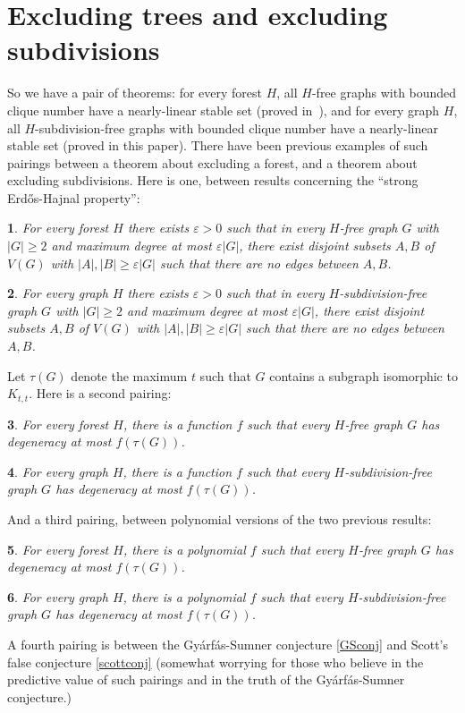 \documentclass[titlepage,11pt]{article}
\newcommand{\vare}{\varepsilon}
\newtheorem{thm}{}[section]
\begin{document}
\section{Excluding trees and excluding subdivisions}

So we have a pair of theorems: for every forest $H$, all $H$-free graphs with bounded clique number have a nearly-linear stable set 
(proved in~\cite{stable1}), and for every graph $H$, all $H$-subdivision-free graphs with bounded clique number have a nearly-linear stable set (proved in this paper).
There have been previous examples of such pairings between a theorem about excluding a forest, and a theorem about
excluding subdivisions. Here is one, between results concerning the ``strong Erd\H{o}s-Hajnal property'':
\begin{thm}\label{purepairs1}
{\bf\cite{pure1}} For every forest $H$ there exists $\vare>0$ such that in every $H$-free graph $G$ with $|G|\ge 2$ and maximum degree at most $\vare|G|$,
there exist disjoint subsets $A,B$ of $V(G)$ with $|A|,|B|\ge \vare|G|$ such that there are no edges between $A,B$.
\end{thm}
\begin{thm}\label{purepairs2}
{\bf\cite{pure2}} For every graph $H$ there exists $\vare>0$ such that in every $H$-subdivision-free graph $G$ with $|G|\ge 2$ and maximum degree at most $\vare|G|$,
there exist disjoint subsets $A,B$ of $V(G)$ with $|A|,|B|\ge \vare|G|$ such that there are no edges between $A,B$.
\end{thm}

Let $\tau(G)$ denote the maximum $t$ such that $G$ contains a subgraph isomorphic to $K_{t,t}$.
Here is a second pairing:
\begin{thm}\label{kiersteadpenrice}
{\bf\cite{kiersteadpenrice}} For every forest $H$, there is a function $f$
such that every $H$-free graph $G$ has degeneracy at most $f(\tau(G))$.
\end{thm}
\begin{thm}\label{kuhnosthus}
{\bf\cite{kuhnosthus}} For every graph $H$, there is a function $f$
such that every $H$-subdivision-free graph $G$ has degeneracy at most $f(\tau(G))$.
\end{thm}
And a third pairing, between polynomial versions of the two previous results:
\begin{thm}\label{poly1}
{\bf\cite{poly1, hunter}} For every forest $H$, there is a polynomial $f$
such that every $H$-free graph $G$ has degeneracy at most $f(\tau(G))$.
\end{thm}
\begin{thm}\label{girao}
{\bf\cite{cook, girao,hunter}} For every graph $H$, there is a polynomial $f$
such that every $H$-subdivision-free graph $G$ has degeneracy at most $f(\tau(G))$.
\end{thm}
A fourth pairing is between the Gy\'arf\'as-Sumner conjecture \ref{GSconj} and Scott's false conjecture 
\ref{scottconj} (somewhat worrying for those who believe in the predictive value of such pairings and in the truth of 
the Gy\'arf\'as-Sumner conjecture.)
\end{document}
